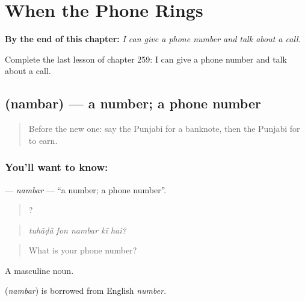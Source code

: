 
\chapter{When the Phone Rings}
\label{ch:pa-a2-when-the-phone-rings}

\begin{chapteropening}
\textbf{By the end of this chapter:} \emph{I can give a phone number and talk about a call.}

Complete the last lesson of chapter 259: I can give a phone number and talk about a call.
\end{chapteropening}

\section[\texorpdfstring{\pa{ਨੰਬਰ} (nambar)}{ਨੰਬਰ (nambar)}]{ (nambar) — a number; a phone number}

\label{lesson:PA-C259-nambar}



\begin{quote}
Before the new one: say the Punjabi for a banknote, then the Punjabi for to earn.
\end{quote}

\subsection*{You'll want to know: }
\textbf{} — \emph{nambar} — \textquotedblleft{}a number; a phone number\textquotedblright{}.

\begin{quote}
    ?
\end{quote}

\begin{quote}
\emph{tuhāḍā fon nambar kī hai?}
\end{quote}

\begin{quote}
What is your phone number?
\end{quote}

A masculine noun.

\begin{cousinweb}
\textbf{} (\emph{nambar}) is borrowed from English \emph{number}.
\end{cousinweb}

